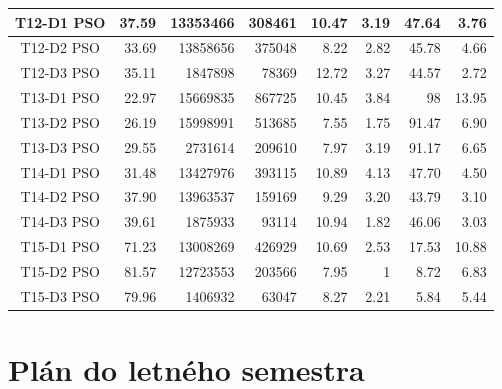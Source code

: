 \documentclass[a4paper,slovak,12pt,appendix]{article}
\begin{document}
\begin{appendices}
\begin{table}[!ht]
\begin{tabular}{|c|r|r|r|r|r|r|r|}
		T12-D1 PSO		&	37.59	&	13353466	&	308461	&	10.47	&	3.19	&	47.64	&	3.76	\\ \hline
		T12-D2 PSO		&	33.69	&	13858656	&	375048	&	8.22	&	2.82	&	45.78	&	4.66	\\ \hline
		T12-D3 PSO		&	35.11	&	1847898		&	78369		&	12.72	&	3.27	&	44.57	&	2.72	\\ \hline

		T13-D1 PSO		&	22.97	&	15669835	&	867725	&	10.45	&	3.84	&	98		&	13.95	\\ \hline
		T13-D2 PSO		&	26.19	&	15998991	&	513685	&	7.55	&	1.75	&	91.47	&	6.90	\\ \hline
		T13-D3 PSO		&	29.55	&	2731614		&	209610	&	7.97	&	3.19	&	91.17	&	6.65	\\ \hline

		T14-D1 PSO		&	31.48	&	13427976	&	393115	&	10.89	&	4.13	&	47.70	&	4.50	\\ \hline
		T14-D2 PSO		&	37.90	&	13963537	&	159169	&	9.29	&	3.20	&	43.79	&	3.10	\\ \hline
		T14-D3 PSO		&	39.61	&	1875933		&	93114		&	10.94	&	1.82	&	46.06	&	3.03	\\ \hline

		T15-D1 PSO		&	71.23	&	13008269	&	426929	&	10.69	&	2.53	&	17.53	&	10.88	\\ \hline
		T15-D2 PSO		&	81.57	&	12723553	&	203566	&	7.95	&	1			&	8.72	&	6.83	\\ \hline
		T15-D3 PSO		&	79.96	&	1406932		&	63047		&	8.27	&	2.21	&	5.84	&	5.44	\\ \hline

  \end{tabular}
\end{table}


\newpage
\section{Plán do letného semestra}


\end{appendices}
\end{document}
